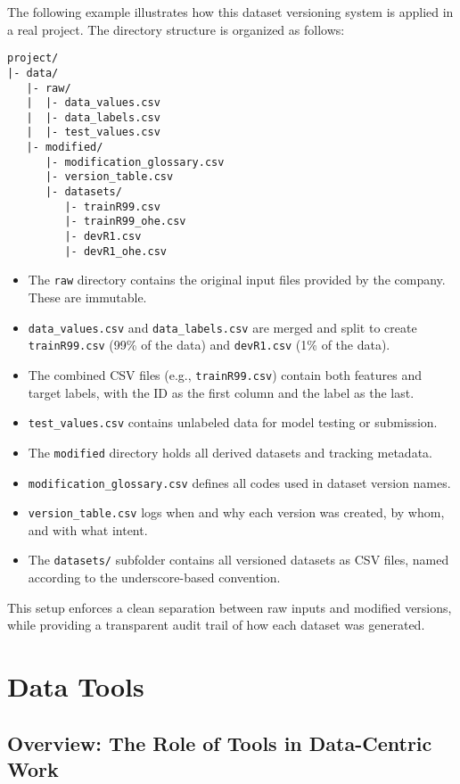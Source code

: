 \documentclass[12pt,openany]{book}
\begin{document}
The following example illustrates how this dataset versioning system is applied in a real project. The directory structure is organized as follows:

\begin{verbatim}
project/
|- data/
   |- raw/
   |  |- data_values.csv
   |  |- data_labels.csv
   |  |- test_values.csv
   |- modified/
      |- modification_glossary.csv
      |- version_table.csv
      |- datasets/
         |- trainR99.csv
         |- trainR99_ohe.csv
         |- devR1.csv
         |- devR1_ohe.csv
\end{verbatim}


\begin{itemize}
    \item The \texttt{raw} directory contains the original input files provided by the company. These are immutable.
    \item \texttt{data\_values.csv} and \texttt{data\_labels.csv} are merged and split to create \texttt{trainR99.csv} (99\% of the data) and \texttt{devR1.csv} (1\% of the data).
    \item The combined CSV files (e.g., \texttt{trainR99.csv}) contain both features and target labels, with the ID as the first column and the label as the last.
    \item \texttt{test\_values.csv} contains unlabeled data for model testing or submission.
    \item The \texttt{modified} directory holds all derived datasets and tracking metadata.
    \item \texttt{modification\_glossary.csv} defines all codes used in dataset version names.
    \item \texttt{version\_table.csv} logs when and why each version was created, by whom, and with what intent.
    \item The \texttt{datasets/} subfolder contains all versioned datasets as CSV files, named according to the underscore-based convention.
\end{itemize}

This setup enforces a clean separation between raw inputs and modified versions, while providing a transparent audit trail of how each dataset was generated.




\chapter{Data Tools}

\section{Overview: The Role of Tools in Data-Centric Work}
\end{document}
